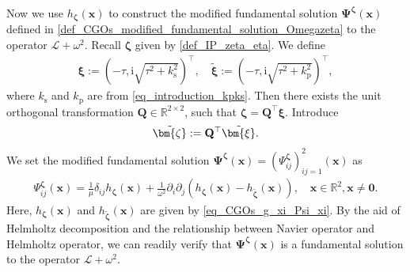 \documentclass[11pt,reqno,oneside]{amsart}
\theoremstyle{definition}
\theoremstyle{remark}
\numberwithin{equation}{section}
\numberwithin{equation}{section}
\theoremstyle{remark}
\begin{document}
Now we use $ h_{\bm{\zeta}}\left(\mathbf{x}\right) $ to construct the modified fundamental solution $ \bm{\Psi}^{\bm{\zeta}}\left(\mathbf{x}\right) $ defined in \eqref{def_CGOs_modified_fundamental_solution_Omegazeta} to the operator $ \mathcal{L}+\omega^2 $. Recall $ \bm{\zeta} $ given by \eqref{def_IP_zeta_eta}. We define
\begin{align} \label{def_CGOs_xi_tildexi} 
	\bm{\xi} := \left(-\tau, \mathrm{i}\sqrt{\tau^2 + k_{\mathrm{s}}^2}\right)^{\top},\quad \tilde{\bm{\xi}} := \left(-\tau, \mathrm{i}\sqrt{\tau^2+k_{\mathrm{p}}^2}\right)^{\top},
\end{align}
where $ k_{\mathrm{s}} $ and $ k_{\mathrm{p}} $ are from \eqref{eq_introduction_kpks}. Then there exists the unit orthogonal transformation $ \mathbf{Q} \in \mathbb{R}^{2 \times 2} $, such that $ \bm{\zeta} =\mathbf{Q} ^\top  \bm{\xi} $. Introduce
\begin{align} \label{def_CGOs_tilde{zeta}=Q^Ttilde{xi}}
	\tilde{\bm{\zeta}} := \mathbf{Q}^{\top} \tilde{\bm{\xi}}.
\end{align}
We set the modified fundamental solution $ \bm{\Psi}^{\bm{\zeta}}\left(\mathbf{x}\right) = \left(\Psi_{i j}^{\bm{\zeta}}\right)_{ij=1}^2\left(\mathbf{x}\right) $ as
\begin{align} \label{def_CGOs_modified_fundamental_solution_Omegazeta}
	\Psi_{i j}^{\bm{\zeta}} \left(\mathbf{x}\right) = \frac{1}{\mu} \delta_{ij} h_{\bm{\zeta}}\left(\mathbf{x}\right) + \frac{1}{\omega^2} \partial_i \partial_j \left( h_{\bm{\zeta}}\left(\mathbf{x}\right) - h_{\tilde{\bm{\zeta}}}\left(\mathbf{x}\right)  \right), \quad \mathbf{x}\in\mathbb{R}^2, \mathbf{x}\neq\mathbf{0}.
\end{align}
Here, $ h_{\bm{\zeta}}\left(\mathbf{x}\right) $ and $ h_{\tilde{\bm{\zeta}}}\left(\mathbf{x}\right) $ are given by \eqref{eq_CGOs_g_xi_Psi_xi}. By the aid of Helmholtz decomposition and the relationship between Navier operator and Helmholtz operator, we can readily verify that $ \bm{\Psi}^{\bm{\zeta}}\left(\mathbf{x}\right) $ is a fundamental solution to the operator $ \mathcal{L}+\omega^2 $.
\end{document}
